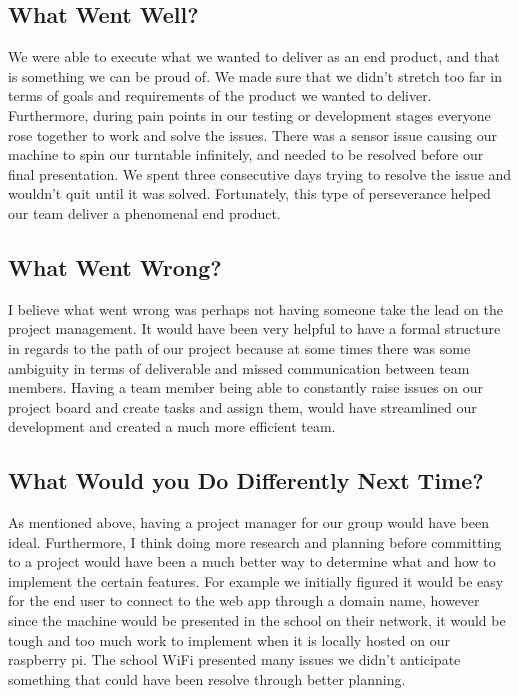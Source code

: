 \documentclass{article}
\begin{document}
\subsection{What Went Well?}
We were able to execute what we wanted to deliver as an end product, and that is something we can be proud of. We made sure that we didn't stretch too far in terms of goals and requirements of the product we wanted to deliver. Furthermore, during pain points in our testing or development stages everyone rose together to work and solve the issues. There was a sensor issue causing our machine to spin our turntable infinitely, and needed to be resolved before our final presentation. We spent three consecutive days trying to resolve the issue and wouldn't quit until it was solved. Fortunately, this type of perseverance helped our team deliver a phenomenal end product. 

\subsection{What Went Wrong?}
I believe what went wrong was perhaps not having someone take the lead on the project management. It would have been very helpful to have a formal structure in regards to the path of our project because at some times there was some ambiguity in terms of deliverable and missed communication between team members. Having a team member being able to constantly raise issues on our project board and create tasks and assign them, would have streamlined our development and created a much more efficient team.

\subsection{What Would you Do Differently Next Time?}
As mentioned above, having a project manager for our group would have been ideal. Furthermore, I think doing more research and planning before committing to a project would have been a much better way to determine what and how to implement the certain features. For example we initially figured it would be easy for the end user to connect to the web app through a domain name, however since the machine would be presented in the school on their network, it would be tough and too much work to implement when it is locally hosted on our raspberry pi. The school WiFi presented many issues we didn't anticipate something that could have been resolve through better planning.
\end{document}
